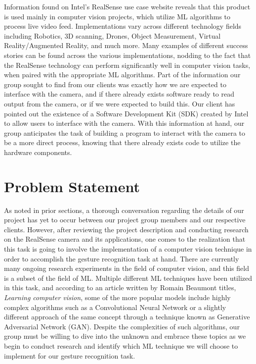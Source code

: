 \documentclass[onecolumn, draftclsnofoot,10pt, compsoc]{IEEEtran}
\begin{document}
Information found on Intel’s RealSense use case website reveals that this product is used mainly in computer vision projects, which utilize ML algorithms to process live video feed. Implementations vary across different technology fields including Robotics, 3D scanning, Drones, Object Measurement, Virtual Reality/Augmented Reality, and much more. Many examples of different success stories can be found across the various implementations, nodding to the fact that the RealSense technology can perform significantly well in computer vision tasks, when paired with the appropriate ML algorithms\cite{second}. Part of the information our group sought to find from our clients was exactly how we are expected to interface with the camera, and if there already exists software ready to read output from the camera, or if we were expected to build this. Our client has pointed out the existence of a Software Development Kit (SDK) created by Intel to allow users to interface with the camera. With this information at hand, our group anticipates the task of building a program to interact with the camera to be a more direct process, knowing that there already exists code to utilize the hardware components.


\section{Problem Statement}
As noted in prior sections, a thorough conversation regarding the details of our project has yet to occur between our project group members and our respective clients. However, after reviewing the project description and conducting research on the RealSense camera and its applications, one comes to the realization that this task is going to involve the implementation of a computer vision technique in order to accomplish the gesture recognition task at hand. There are currently many ongoing research experiments in the field of computer vision, and this field is a subset of the field of ML. Multiple different ML techniques have been utilized in this task, and according to an article written by Romain Beaumont titles, \textit{Learning computer vision}, some of the more popular models include highly complex algorithms such as a Convolutional Neural Network or a slightly different approach of the same concept through a technique known as Generative Adversarial Network (GAN)\cite{third}. Despite the complexities of such algorithms, our group must be willing to dive into the unknown and embrace these topics as we begin to conduct research and identify which ML technique we will choose to implement for our gesture recognition task.
\end{document}
